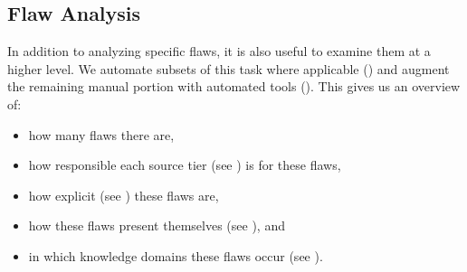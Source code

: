 \subsection{Flaw Analysis}
\label{flaw-analysis}

In addition to analyzing specific flaws, it is also useful to examine them at
a higher level. We automate subsets of this task where applicable
() and augment the remaining manual portion with
automated tools (). This gives us an overview of:
\begin{itemize}
    \item how many flaws there are,
    \item how responsible each source tier (see ) is for these flaws,
    \item how explicit (see ) these flaws are,
    \item how these flaws present themselves (see ), and
    \item in which knowledge domains these flaws occur (see ).
\end{itemize}

